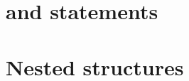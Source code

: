 \begin{sloppypar}
 \section{{} and {} statements}

 \section{Nested structures}




\end{sloppypar}
